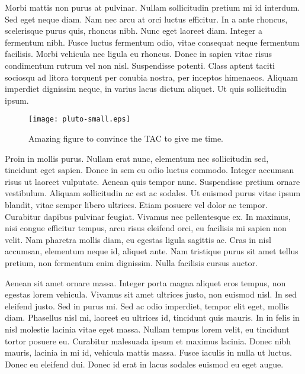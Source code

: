 \documentclass{lowell-prop}
\begin{document}
Morbi mattis non purus at pulvinar. Nullam sollicitudin pretium mi id interdum. Sed eget neque diam. Nam nec arcu at orci luctus efficitur. In a ante rhoncus, scelerisque purus quis, rhoncus nibh. Nunc eget laoreet diam. Integer a fermentum nibh. Fusce luctus fermentum odio, vitae consequat neque fermentum facilisis. Morbi vehicula nec ligula eu rhoncus. Donec in sapien vitae risus condimentum rutrum vel non nisl. Suspendisse potenti. Class aptent taciti sociosqu ad litora torquent per conubia nostra, per inceptos himenaeos. Aliquam imperdiet dignissim neque, in varius lacus dictum aliquet. Ut quis sollicitudin ipsum.

 \begin{figure}
   \texttt{[image: pluto-small.eps]} %
      \caption{Amazing figure to convince the TAC to give me time.}\label{fig:name}
 \end{figure}


Proin in mollis purus. Nullam erat nunc, elementum nec sollicitudin sed, tincidunt eget sapien. Donec in sem eu odio luctus commodo. Integer accumsan risus ut laoreet vulputate. Aenean quis tempor nunc. Suspendisse pretium ornare vestibulum. Aliquam sollicitudin ac est ac sodales. Ut euismod purus vitae ipsum blandit, vitae semper libero ultrices. Etiam posuere vel dolor ac tempor. Curabitur dapibus pulvinar feugiat. Vivamus nec pellentesque ex. In maximus, nisi congue efficitur tempus, arcu risus eleifend orci, eu facilisis mi sapien non velit. Nam pharetra mollis diam, eu egestas ligula sagittis ac. Cras in nisl accumsan, elementum neque id, aliquet ante. Nam tristique purus sit amet tellus pretium, non fermentum enim dignissim. Nulla facilisis cursus auctor.

Aenean sit amet ornare massa. Integer porta magna aliquet eros tempus, non egestas lorem vehicula. Vivamus sit amet ultrices justo, non euismod nisl. In sed eleifend justo. Sed in purus mi. Sed ac odio imperdiet, tempor elit eget, mollis diam. Phasellus nisl mi, laoreet eu ultrices id, tincidunt quis mauris. In in felis in nisl molestie lacinia vitae eget massa. Nullam tempus lorem velit, eu tincidunt tortor posuere eu. Curabitur malesuada ipsum et maximus lacinia. Donec nibh mauris, lacinia in mi id, vehicula mattis massa. Fusce iaculis in nulla ut luctus. Donec eu eleifend dui. Donec id erat in lacus sodales euismod eu eget augue.


%
\end{document}
